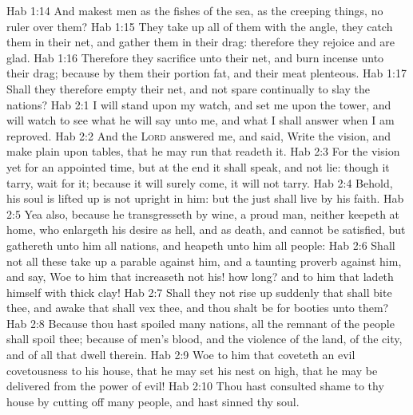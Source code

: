 \vs Hab 1:14 And makest men as the fishes of the sea, as the creeping things,  no ruler over them?
\vs Hab 1:15 They take up all of them with the angle, they catch them in their net, and gather them in their drag: therefore they rejoice and are glad.
\vs Hab 1:16 Therefore they sacrifice unto their net, and burn incense unto their drag; because by them their portion  fat, and their meat plenteous.
\vs Hab 1:17 Shall they therefore empty their net, and not spare continually to slay the nations?
\vs Hab 2:1 I will stand upon my watch, and set me upon the tower, and will watch to see what he will say unto me, and what I shall answer when I am reproved.
\vs Hab 2:2 And the \textsc{Lord} answered me, and said, Write the vision, and make  plain upon tables, that he may run that readeth it.
\vs Hab 2:3 For the vision  yet for an appointed time, but at the end it shall speak, and not lie: though it tarry, wait for it; because it will surely come, it will not tarry.
\vs Hab 2:4 Behold, his soul  is lifted up is not upright in him: but the just shall live by his faith.
\vs Hab 2:5 Yea also, because he transgresseth by wine,  a proud man, neither keepeth at home, who enlargeth his desire as hell, and  as death, and cannot be satisfied, but gathereth unto him all nations, and heapeth unto him all people:
\vs Hab 2:6 Shall not all these take up a parable against him, and a taunting proverb against him, and say, Woe to him that increaseth  not his! how long? and to him that ladeth himself with thick clay!
\vs Hab 2:7 Shall they not rise up suddenly that shall bite thee, and awake that shall vex thee, and thou shalt be for booties unto them?
\vs Hab 2:8 Because thou hast spoiled many nations, all the remnant of the people shall spoil thee; because of men's blood, and  the violence of the land, of the city, and of all that dwell therein.
\vs Hab 2:9 Woe to him that coveteth an evil covetousness to his house, that he may set his nest on high, that he may be delivered from the power of evil!
\vs Hab 2:10 Thou hast consulted shame to thy house by cutting off many people, and hast sinned  thy soul.
